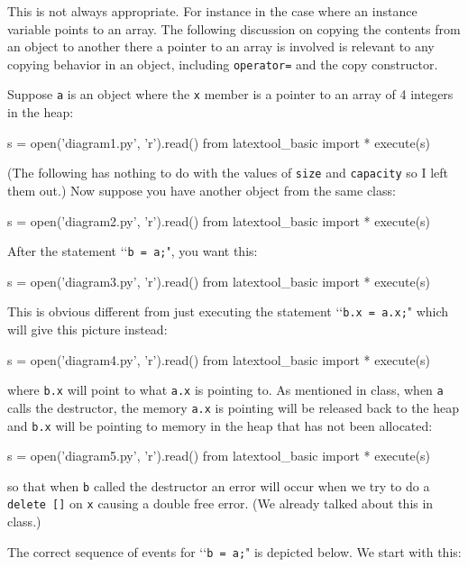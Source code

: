 This is not always appropriate. For instance in the case where an instance 
variable points to an array. The following discussion on copying the contents 
from an object to another there a pointer to an array is involved is relevant 
to any copying behavior in an object, including \verb!operator=! and the copy 
constructor. 

Suppose \verb!a! is an object where the \verb!x! member is a pointer to an 
array of 4 integers in the heap:
\begin{python}
s = open('diagram1.py', 'r').read()
from latextool_basic import *
execute(s)
\end{python}

(The following has nothing to do with the values of \verb!size! and \verb!capacity!
so I left them out.)
Now suppose 
you have another object from the same class:
\begin{python}
s = open('diagram2.py', 'r').read()
from latextool_basic import *
execute(s)
\end{python}


After the statement \lq\lq \verb!b = a;!", you want this:

\begin{python}
s = open('diagram3.py', 'r').read()
from latextool_basic import *
execute(s)
\end{python}

This is obvious different from just executing the 
statement \lq\lq \verb!b.x = a.x;!" which will give this 
picture instead:

\begin{python}
s = open('diagram4.py', 'r').read()
from latextool_basic import *
execute(s)
\end{python}

where \verb!b.x! will point to what \verb!a.x! is pointing 
to.
As mentioned in class, when \verb!a! calls the destructor, the
memory \verb!a.x! is pointing will be released
back to the heap and \verb!b.x! 
will be pointing to
memory in the heap that has not been allocated:
\begin{python}
s = open('diagram5.py', 'r').read()
from latextool_basic import *
execute(s)
\end{python}

so that when \verb!b! called the destructor an error will occur 
when we try to do a \verb!delete []! on \verb!x!
causing a double free error.
(We already 
talked about this in class.) 

The correct sequence of events for \lq\lq\verb!b = a;!"
is depicted below.
We start with this:

